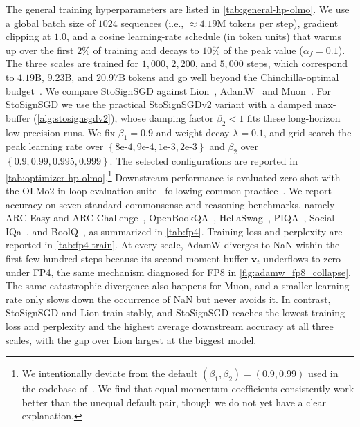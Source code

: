 \documentclass{article}
\def \v {\mathbf{v}}
\newcommand{\cbrac}[1]{\left\{#1\right\}}
\begin{document}
The general training hyperparameters are listed in \cref{tab:general-hp-olmo}. We use a global batch size of $1024$ sequences (i.e., $\approx 4.19$M tokens per step), gradient clipping at $1.0$, and a cosine learning-rate schedule (in token units) that warms up over the first $2\%$ of training and decays to $10\%$ of the peak value ($\alpha_f=0.1$). The three scales are trained for $1{,}000$, $2{,}200$, and $5{,}000$ steps, which correspond to $4.19$B, $9.23$B, and $20.97$B tokens and go well beyond the Chinchilla-optimal budget~\citep{hoffmann2022chinchilla}. We compare StoSignSGD against Lion~\citep{chen2023symbolic}, AdamW~\citep{loshchilov2019adamw} and Muon~\citep{jordan2024muon}. For StoSignSGD we use the practical StoSignSGDv2 variant with a damped max-buffer (\cref{alg:stosignsgdv2}), whose damping factor $\beta_2<1$ fits these long-horizon low-precision runs. We fix $\beta_1=0.9$ and weight decay $\lambda=0.1$, and grid-search the peak learning rate over $\cbrac{8\text{e-}4, 9\text{e-}4, 1\text{e-}3, 2\text{e-}3}$ and $\beta_2$ over $\cbrac{0.9, 0.99, 0.995, 0.999}$. The selected configurations are reported in \cref{tab:optimizer-hp-olmo}.\footnote{We intentionally deviate from the default $(\beta_1,\beta_2)=(0.9,0.99)$ used in the codebase of~\citet{chen2026tetrajetv2}. We find that equal momentum coefficients consistently work better than the unequal default pair, though we do not yet have a clear explanation.} Downstream performance is evaluated zero-shot with the OLMo2 in-loop evaluation suite~\citep{olmo2024olmo2,eval-harness} following common practice~\citep{pan2025unbiased,chen2026tetrajetv2}. We report accuracy on seven standard commonsense and reasoning benchmarks, namely ARC-Easy and ARC-Challenge~\citep{clark2018arc}, OpenBookQA~\citep{mihaylov2018openbookqa}, HellaSwag~\citep{zellers2019hellaswag}, PIQA~\citep{bisk2020piqa}, Social IQa~\citep{sap2019socialiqa}, and BoolQ~\citep{clark2019boolq}, as summarized in \cref{tab:fp4}. Training loss and perplexity are reported in \cref{tab:fp4-train}. At every scale, AdamW diverges to NaN within the first few hundred steps because its second-moment buffer $\v_t$ underflows to zero under FP4, the same mechanism diagnosed for FP8 in \cref{fig:adamw_fp8_collapse}. The same catastrophic divergence also happens for Muon, and a smaller learning rate only slows down the occurrence of NaN but never avoids it. In contrast, StoSignSGD and Lion train stably, and StoSignSGD reaches the lowest training loss and perplexity and the highest average downstream accuracy at all three scales, with the gap over Lion largest at the biggest model.
\end{document}
